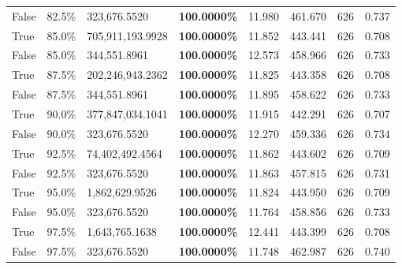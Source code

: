 \begin{table}[H]
\begin{tabular}{lllrllll}
\cline{1-8}
False & 82.5\% & 323,676.5520 & \bfseries \color{red} 100.0000\% & 11.980 & 461.670 & 626 & 0.737 \\
\cline{1-8}
True & 85.0\% & 705,911,193.9928 & \bfseries \color{red} 100.0000\% & 11.852 & 443.441 & 626 & 0.708 \\
\cline{1-8}
False & 85.0\% & 344,551.8961 & \bfseries \color{red} 100.0000\% & 12.573 & 458.966 & 626 & 0.733 \\
\cline{1-8}
True & 87.5\% & 202,246,943.2362 & \bfseries \color{red} 100.0000\% & 11.825 & 443.358 & 626 & 0.708 \\
\cline{1-8}
False & 87.5\% & 344,551.8961 & \bfseries \color{red} 100.0000\% & 11.895 & 458.622 & 626 & 0.733 \\
\cline{1-8}
True & 90.0\% & 377,847,034.1041 & \bfseries \color{red} 100.0000\% & 11.915 & 442.291 & 626 & 0.707 \\
\cline{1-8}
False & 90.0\% & 323,676.5520 & \bfseries \color{red} 100.0000\% & 12.270 & 459.336 & 626 & 0.734 \\
\cline{1-8}
True & 92.5\% & 74,402,492.4564 & \bfseries \color{red} 100.0000\% & 11.862 & 443.602 & 626 & 0.709 \\
\cline{1-8}
False & 92.5\% & 323,676.5520 & \bfseries \color{red} 100.0000\% & 11.863 & 457.815 & 626 & 0.731 \\
\cline{1-8}
True & 95.0\% & 1,862,629.9526 & \bfseries \color{red} 100.0000\% & 11.824 & 443.950 & 626 & 0.709 \\
\cline{1-8}
False & 95.0\% & 323,676.5520 & \bfseries \color{red} 100.0000\% & 11.764 & 458.856 & 626 & 0.733 \\
\cline{1-8}
True & 97.5\% & 1,643,765.1638 & \bfseries \color{red} 100.0000\% & 12.441 & 443.399 & 626 & 0.708 \\
\cline{1-8}
False & 97.5\% & 323,676.5520 & \bfseries \color{red} 100.0000\% & 11.748 & 462.987 & 626 & 0.740 \\
\cline{1-8}
\bottomrule
\end{tabular}
\end{table}
